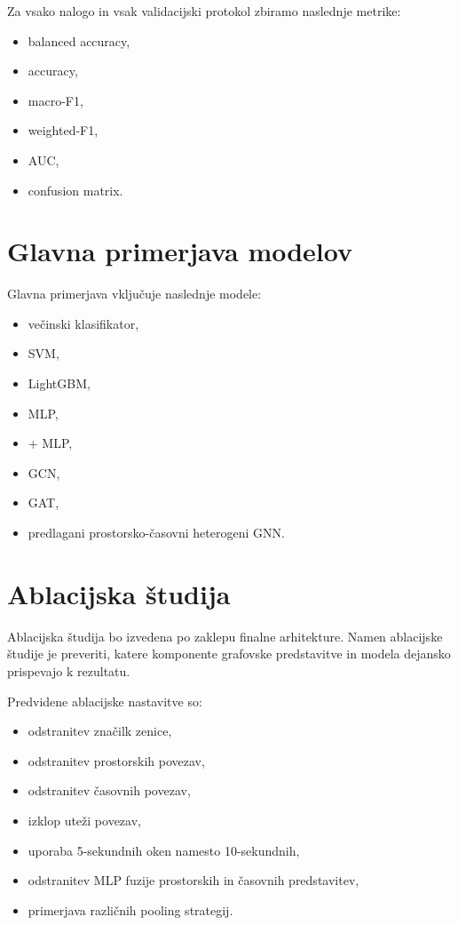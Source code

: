 Za vsako nalogo in vsak validacijski protokol zbiramo naslednje metrike:
\begin{itemize}
    \item balanced accuracy,
    \item accuracy,
    \item macro-F1,
    \item weighted-F1,
    \item AUC,
    \item confusion matrix.
\end{itemize}


\section{Glavna primerjava modelov}
\label{subsec:glavna-primerjava}

Glavna primerjava vključuje naslednje modele:
\begin{itemize}
    \item večinski klasifikator,
    \item SVM,
    \item LightGBM,
    \item MLP,
    \item \GazeMAE{} + MLP,
    \item GCN,
    \item GAT,
    \item predlagani prostorsko-časovni heterogeni GNN.
\end{itemize}


\section{Ablacijska študija}
\label{subsec:ablacijska-studija}

Ablacijska študija bo izvedena po zaklepu finalne arhitekture.
Namen ablacijske študije je preveriti, katere komponente grafovske predstavitve in modela dejansko prispevajo k rezultatu.

Predvidene ablacijske nastavitve so:
\begin{itemize}
    \item odstranitev značilk zenice,
    \item odstranitev prostorskih povezav,
    \item odstranitev časovnih povezav,
    \item izklop uteži povezav,
    \item uporaba 5-sekundnih oken namesto 10-sekundnih,
    \item odstranitev MLP fuzije prostorskih in časovnih predstavitev,
    \item primerjava različnih pooling strategij.
\end{itemize}

